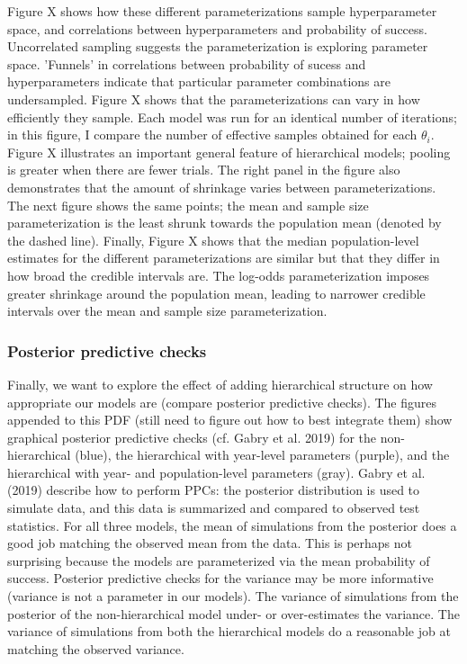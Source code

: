 \documentclass[12pt, oneside, titlepage]{article}   	%
\begin{document}
Figure X shows how these different parameterizations sample hyperparameter space, and correlations between hyperparameters and probability of success. Uncorrelated sampling suggests the parameterization is exploring parameter space. 'Funnels' in correlations between probability of sucess and hyperparameters indicate that particular parameter combinations are undersampled. Figure X shows that the parameterizations can vary in how efficiently they sample. Each model was run for an identical number of iterations; in this figure, I compare the number of effective samples obtained for each $\theta_i$. Figure X illustrates an important general feature of hierarchical models; pooling is greater when there are fewer trials. The right panel in the figure also demonstrates that the amount of shrinkage varies between parameterizations. The next figure shows the same points; the mean and sample size parameterization is the least shrunk towards the population mean (denoted by the dashed line). Finally, Figure X shows that the median population-level estimates for the different parameterizations are similar but that they differ in how broad the credible intervals are. The log-odds parameterization imposes greater shrinkage around the population mean, leading to narrower credible intervals over the mean and sample size parameterization.  
 
\subsubsection*{Posterior predictive checks}
 
Finally, we want to explore the effect of adding hierarchical structure on how appropriate our models are (compare posterior predictive checks). The figures appended to this PDF (still need to figure out how to best integrate them) show graphical posterior predictive checks (cf. Gabry et al. 2019) for the non-hierarchical (blue), the hierarchical with year-level parameters (purple), and the hierarchical with year- and population-level parameters (gray). Gabry et al. (2019) describe how to perform PPCs: the posterior distribution is used to  simulate data, and this data is summarized and compared to observed test statistics. For all three models, the mean of simulations from the posterior does a good job matching the observed mean from the data. This is perhaps not surprising because the models are parameterized via the mean probability of success. Posterior predictive checks for the variance may be more informative (variance is not a parameter in our models). The variance of simulations from the posterior of the non-hierarchical model under- or over-estimates the variance. The variance of simulations from both the hierarchical models do a reasonable job at matching the observed variance. 
\end{document}
